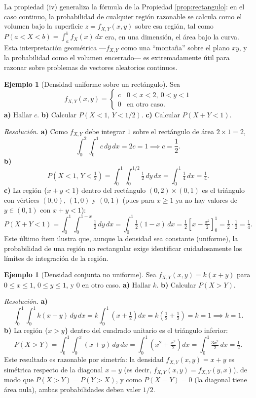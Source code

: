 \documentclass[11pt,a4paper]{article}
\theoremstyle{plain}
\theoremstyle{definition}
\newtheorem{ejemplo}[teorema]{Ejemplo}
\theoremstyle{remark}
\begin{document}
La propiedad (iv) generaliza la fórmula de la Propiedad \ref{prop:rectangulo}: en el caso continuo, la probabilidad de cualquier región razonable se calcula como el volumen bajo la superficie $z=f_{X,Y}(x,y)$ sobre esa región, tal como $P(a<X<b)=\int_a^b f_X(x)\,dx$ era, en una dimensión, el área bajo la curva. Esta interpretación geométrica —$f_{X,Y}$ como una ``montaña'' sobre el plano $xy$, y la probabilidad como el volumen encerrado— es extremadamente útil para razonar sobre problemas de vectores aleatorios continuos.

\begin{ejemplo}[Densidad uniforme sobre un rectángulo]\label{ej:densidad-uniforme}
Sea
\[
f_{X,Y}(x,y) = \begin{cases} c & 0<x<2,\ 0<y<1 \\ 0 & \text{en otro caso.}\end{cases}
\]
\textbf{a)} Hallar $c$. \quad \textbf{b)} Calcular $P(X<1,\,Y<1/2)$. \quad \textbf{c)} Calcular $P(X+Y<1)$.

\emph{Resolución.} \textbf{a)} Como $f_{X,Y}$ debe integrar $1$ sobre el rectángulo de área $2\times1=2$,
\[
\int_0^2\int_0^1 c\,dy\,dx = 2c=1 \implies c=\frac12.
\]
\textbf{b)}
\[
P\left(X<1,\,Y<\tfrac12\right) = \int_0^1\int_0^{1/2}\tfrac12\,dy\,dx = \int_0^1\tfrac14\,dx=\tfrac14.
\]
\textbf{c)} La región $\{x+y<1\}$ dentro del rectángulo $(0,2)\times(0,1)$ es el triángulo con vértices $(0,0)$, $(1,0)$ y $(0,1)$ (pues para $x\ge1$ ya no hay valores de $y\in(0,1)$ con $x+y<1$):
\[
P(X+Y<1) = \int_0^1\int_0^{1-x} \tfrac12\,dy\,dx = \int_0^1 \tfrac12(1-x)\,dx = \tfrac12\left[x-\tfrac{x^2}{2}\right]_0^1 = \tfrac12\cdot\tfrac12=\tfrac14.
\]
Este último ítem ilustra que, aunque la densidad sea constante (uniforme), la probabilidad de una región no rectangular exige identificar cuidadosamente los límites de integración de la región.
\end{ejemplo}

\begin{ejemplo}[Densidad conjunta no uniforme]\label{ej:densidad-xy}
Sea $f_{X,Y}(x,y)=k(x+y)$ para $0\le x\le1$, $0\le y\le1$, y $0$ en otro caso. \textbf{a)} Hallar $k$. \textbf{b)} Calcular $P(X>Y)$.

\emph{Resolución.} \textbf{a)}
\[
\int_0^1\int_0^1 k(x+y)\,dy\,dx = k\int_0^1\left(x+\tfrac12\right)dx = k\left(\tfrac12+\tfrac12\right)=k=1 \implies k=1.
\]
\textbf{b)} La región $\{x>y\}$ dentro del cuadrado unitario es el triángulo inferior:
\[
P(X>Y) = \int_0^1\int_0^x (x+y)\,dy\,dx = \int_0^1\left(x^2+\tfrac{x^2}{2}\right)dx = \int_0^1\tfrac{3x^2}{2}\,dx=\tfrac12.
\]
Este resultado es razonable por simetría: la densidad $f_{X,Y}(x,y)=x+y$ es simétrica respecto de la diagonal $x=y$ (es decir, $f_{X,Y}(x,y)=f_{X,Y}(y,x)$), de modo que $P(X>Y)=P(Y>X)$, y como $P(X=Y)=0$ (la diagonal tiene área nula), ambas probabilidades deben valer $1/2$.
\end{ejemplo}
\end{document}
